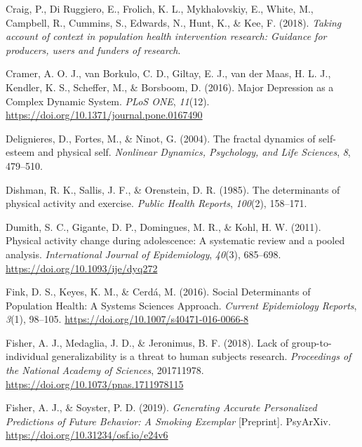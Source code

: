 \documentclass[
  british,
  man,floatsintext]{apa6}
\begin{document}
\leavevmode\hypertarget{ref-craigTakingAccountContext2018}{}%
Craig, P., Di Ruggiero, E., Frolich, K. L., Mykhalovskiy, E., White, M., Campbell, R., Cummins, S., Edwards, N., Hunt, K., \& Kee, F. (2018). \emph{Taking account of context in population health intervention research: Guidance for producers, users and funders of research}.

\leavevmode\hypertarget{ref-cramerMajorDepressionComplex2016}{}%
Cramer, A. O. J., van Borkulo, C. D., Giltay, E. J., van der Maas, H. L. J., Kendler, K. S., Scheffer, M., \& Borsboom, D. (2016). Major Depression as a Complex Dynamic System. \emph{PLoS ONE}, \emph{11}(12). \url{https://doi.org/10.1371/journal.pone.0167490}

\leavevmode\hypertarget{ref-delignieresFractalDynamicsSelfesteem2004}{}%
Delignieres, D., Fortes, M., \& Ninot, G. (2004). The fractal dynamics of self-esteem and physical self. \emph{Nonlinear Dynamics, Psychology, and Life Sciences}, \emph{8}, 479--510.

\leavevmode\hypertarget{ref-dishmanDeterminantsPhysicalActivity1985}{}%
Dishman, R. K., Sallis, J. F., \& Orenstein, D. R. (1985). The determinants of physical activity and exercise. \emph{Public Health Reports}, \emph{100}(2), 158--171.

\leavevmode\hypertarget{ref-dumithPhysicalActivityChange2011}{}%
Dumith, S. C., Gigante, D. P., Domingues, M. R., \& Kohl, H. W. (2011). Physical activity change during adolescence: A systematic review and a pooled analysis. \emph{International Journal of Epidemiology}, \emph{40}(3), 685--698. \url{https://doi.org/10.1093/ije/dyq272}

\leavevmode\hypertarget{ref-finkSocialDeterminantsPopulation2016}{}%
Fink, D. S., Keyes, K. M., \& Cerdá, M. (2016). Social Determinants of Population Health: A Systems Sciences Approach. \emph{Current Epidemiology Reports}, \emph{3}(1), 98--105. \url{https://doi.org/10.1007/s40471-016-0066-8}

\leavevmode\hypertarget{ref-fisherLackGrouptoindividualGeneralizability2018}{}%
Fisher, A. J., Medaglia, J. D., \& Jeronimus, B. F. (2018). Lack of group-to-individual generalizability is a threat to human subjects research. \emph{Proceedings of the National Academy of Sciences}, 201711978. \url{https://doi.org/10.1073/pnas.1711978115}

\leavevmode\hypertarget{ref-fisherGeneratingAccuratePersonalized2019}{}%
Fisher, A. J., \& Soyster, P. D. (2019). \emph{Generating Accurate Personalized Predictions of Future Behavior: A Smoking Exemplar} {[}Preprint{]}. PsyArXiv. \url{https://doi.org/10.31234/osf.io/e24v6}
\end{document}

